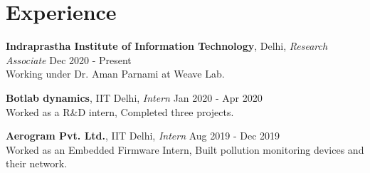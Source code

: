 \documentclass[10pt]{report}
\begin{document}
\section*{\color{BlueViolet}\faSuitcase\hspace{1pt} Experience} %

\item{\textbf{Indraprastha Institute of Information Technology}, Delhi, \textit{Research Associate}} 
\hfill{Dec 2020 - Present}\\
Working under Dr. Aman Parnami at Weave Lab.
\item{\textbf{Botlab dynamics}, IIT Delhi, \textit{Intern}}
\hfill{Jan 2020 - Apr 2020}\\
Worked as a R\&D intern, Completed three projects.

\item{\textbf{Aerogram Pvt. Ltd.}, IIT Delhi, \textit{Intern}  }
\hfill{Aug 2019 - Dec 2019}\\
Worked as an Embedded Firmware Intern, Built pollution monitoring devices and their network.





 
\\%

\end{document}
